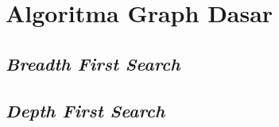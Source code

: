 \chapter{Algoritma Graph Dasar}

\section{\textit{Breadth First Search}}


\section{\textit{Depth First Search}}